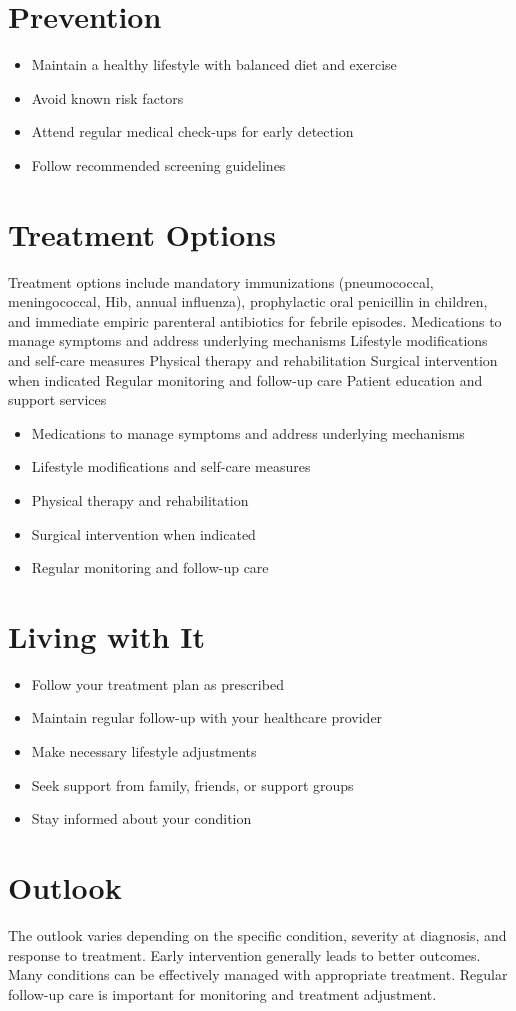 \section{Prevention}
\begin{itemize}[noitemsep]
  \item Maintain a healthy lifestyle with balanced diet and exercise
  \item Avoid known risk factors
  \item Attend regular medical check-ups for early detection
  \item Follow recommended screening guidelines
\end{itemize}
\section{Treatment Options}
Treatment options include mandatory immunizations (pneumococcal, meningococcal, Hib, annual influenza), prophylactic oral penicillin in children, and immediate empiric parenteral antibiotics for febrile episodes. Medications to manage symptoms and address underlying mechanisms Lifestyle modifications and self-care measures Physical therapy and rehabilitation Surgical intervention when indicated Regular monitoring and follow-up care Patient education and support services

\begin{itemize}[noitemsep]
  \item Medications to manage symptoms and address underlying mechanisms
  \item Lifestyle modifications and self-care measures
  \item Physical therapy and rehabilitation
  \item Surgical intervention when indicated
  \item Regular monitoring and follow-up care
\end{itemize}
\section{Living with It}
\begin{itemize}[noitemsep]
  \item Follow your treatment plan as prescribed
  \item Maintain regular follow-up with your healthcare provider
  \item Make necessary lifestyle adjustments
  \item Seek support from family, friends, or support groups
  \item Stay informed about your condition
\end{itemize}
\section{Outlook}
The outlook varies depending on the specific condition, severity at diagnosis, and response to treatment. Early intervention generally leads to better outcomes. Many conditions can be effectively managed with appropriate treatment. Regular follow-up care is important for monitoring and treatment adjustment.

